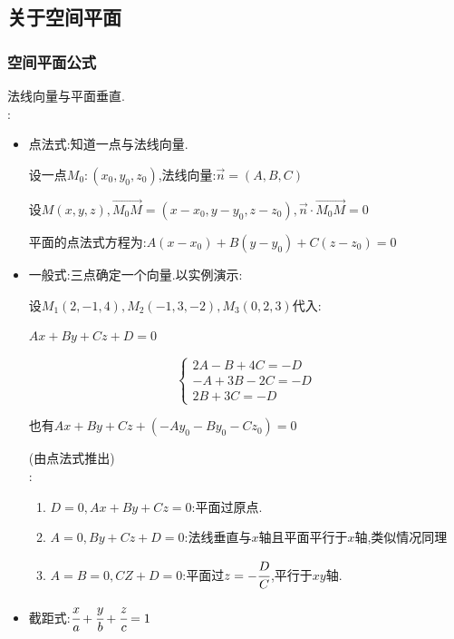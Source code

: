 {{  }%

  \subsection{关于空间平面}{

    \subsubsection{空间平面公式}{
      法线向量与平面垂直.\\

      :
      \begin{itemize}
        \item {
              点法式:知道一点与法线向量.

              设一点$M_0:(x_0,y_0,z_0)$,法线向量:$\vec{n} = (A,B,C)$

              设$M(x,y,z),\vec{M_0M}=(x - x_0,y - y_0,z - z_0),\vec{n} \cdot \vec{M_0M} = 0$

              平面的点法式方程为:$A(x - x_0) + B(y - y_0) + C(z - z_0) = 0$
              }
        \item {
              一般式:三点确定一个向量.以实例演示:

              设$M_1(2,-1,4),M_2(-1,3,-2),M_3(0,2,3)$代入:

              $Ax + By + Cz + D = 0$

              $$
                \begin{cases}
                  2A - B + 4C = -D \\
                  -A + 3B -2C = -D \\
                  2B + 3C = -D
                \end{cases}
              $$

              也有$Ax + By + Cz + (-Ay_0 - By_0 - Cz_0) = 0$

              (由点法式推出)\\

              :
              \begin{enumerate}
                \item $D = 0,Ax + By + Cz = 0$:平面过原点.
                \item $A = 0,By + Cz + D = 0$:法线垂直与$x$轴且平面平行于$x$轴,类似情况同理
                \item $A = B = 0,CZ + D = 0$:平面过$z = -\cfrac{D}{C}$,平行于$xy$轴.
              \end{enumerate}
              }
        \item 截距式:$\cfrac{x}{a} + \cfrac{y}{b} + \cfrac{z}{c} = 1$
      \end{itemize}
    }%

}}

